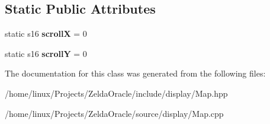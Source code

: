 \subsection*{Static Public Attributes}
\begin{DoxyCompactItemize}
\item 
\hypertarget{classMap_ab83915d4ac29e11a9c602551643d7bf4}{static s16 {\bfseries scroll\+X} = 0}\label{classMap_ab83915d4ac29e11a9c602551643d7bf4}

\item 
\hypertarget{classMap_a147fb969692ce9073350050018589f29}{static s16 {\bfseries scroll\+Y} = 0}\label{classMap_a147fb969692ce9073350050018589f29}

\end{DoxyCompactItemize}


The documentation for this class was generated from the following files\+:\begin{DoxyCompactItemize}
\item 
/home/linux/\+Projects/\+Zelda\+Oracle/include/display/Map.\+hpp\item 
/home/linux/\+Projects/\+Zelda\+Oracle/source/display/Map.\+cpp\end{DoxyCompactItemize}
